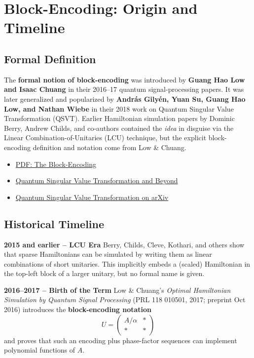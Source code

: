 \documentclass[11pt,a4paper]{article}
\begin{document}
	
\section{Block-Encoding: Origin and Timeline}
	
	\subsection{Formal Definition}
	The \textbf{formal notion of block-encoding} was introduced by \textbf{Guang Hao Low and Isaac Chuang} in their 2016–17 quantum signal-processing papers. It was later generalized and popularized by \textbf{András Gilyén, Yuan Su, Guang Hao Low, and Nathan Wiebe} in their 2018 work on Quantum Singular Value Transformation (QSVT). Earlier Hamiltonian simulation papers by Dominic Berry, Andrew Childs, and co-authors contained the \textit{idea} in disguise via the Linear Combination-of-Unitaries (LCU) technique, but the explicit block-encoding definition and notation come from Low \& Chuang.
	
	\begin{itemize}
		\item \href{https://www.ias.edu/sites/default/files/Tang%20qsvt_lect_1.pdf?utm_source=chatgpt.com}{PDF: The Block-Encoding}
		\item \href{https://dl.acm.org/doi/pdf/10.1145/3313276.3316366?utm_source=chatgpt.com}{Quantum Singular Value Transformation and Beyond}
		\item \href{https://arxiv.org/abs/1806.01838?utm_source=chatgpt.com}{Quantum Singular Value Transformation on arXiv}
	\end{itemize}
	
	\subsection{Historical Timeline}
	
	\textbf{2015 and earlier – LCU Era}  
	Berry, Childs, Cleve, Kothari, and others show that sparse Hamiltonians can be simulated by writing them as linear combinations of short unitaries. This implicitly embeds a (scaled) Hamiltonian in the top-left block of a larger unitary, but no formal name is given.
	
	\textbf{2016–2017 – Birth of the Term}  
	Low \& Chuang’s \textit{Optimal Hamiltonian Simulation by Quantum Signal Processing} (PRL 118 010501, 2017; preprint Oct 2016) introduces the \textbf{block-encoding notation}
	\[
	U = \begin{pmatrix} A/\alpha & * \\ * & * \end{pmatrix}
	\]
	and proves that such an encoding plus phase-factor sequences can implement polynomial functions of \( A \).
	
\end{document}
